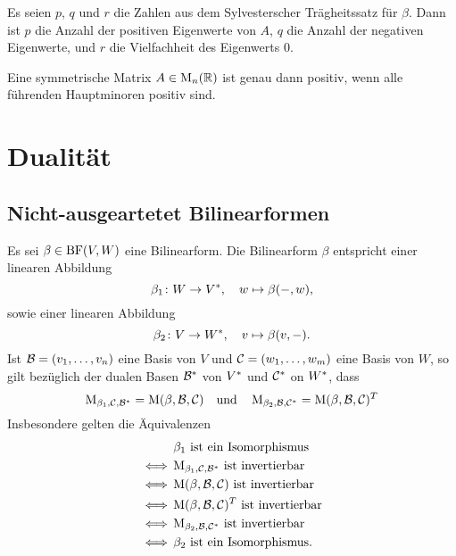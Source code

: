 \begin{proposition}
  Es seien $p$, $q$ und $r$ die Zahlen aus dem Sylvesterscher Trägheitssatz für $\beta$.
  Dann ist $p$ die Anzahl der positiven Eigenwerte von $A$, $q$ die Anzahl der negativen Eigenwerte, und $r$ die Vielfachheit des Eigenwerts $0$.
\end{proposition}

\begin{lemma}[Hauptminorenkriterium]
  Eine symmetrische Matrix $A \in \operatorname{M}_{n}(\mathbb{R})$ ist genau dann positiv, wenn alle führenden Hauptminoren positiv sind.
\end{lemma}





\section{Dualität}



\subsection{Nicht-ausgeartetet Bilinearformen}

Es sei $\beta \in \operatorname{BF}(V, W)$ eine Bilinearform.
Die Bilinearform $\beta$ entspricht einer linearen Abbildung
\[
          \beta_1
  \colon  W
  \to     V^*,
  \quad
          w
  \mapsto \beta(-,w),
\]
sowie einer linearen Abbildung
\[
          \beta_2
  \colon  V
  \to     W^*,
  \quad
          v
  \mapsto \beta(v,-).
\]
Ist $\mathcal{B} = (v_1, \dotsc, v_n)$ eine Basis von $V$ und $\mathcal{C} = (w_1, \dotsc, w_m)$ eine Basis von $W$, so gilt bezüglich der dualen Basen $\mathcal{B}^*$ von $V^*$ und $\mathcal{C}^*$ on $W^*$, dass
\[
    \operatorname{M}_{\beta_1, \mathcal{C}, \mathcal{B}^*}
  = \operatorname{M}(\beta, \mathcal{B}, \mathcal{C})
  \quad\text{und}\quad
    \operatorname{M}_{\beta_2, \mathcal{B}, \mathcal{C}^*}
  = \operatorname{M}(\beta, \mathcal{B}, \mathcal{C}) ^T
\]
Insbesondere gelten die Äquivalenzen
\begin{align*}
      &\, \text{$\beta_1$ ist ein Isomorphismus}                                                  \\
  \iff&\, \text{$\operatorname{M}_{\beta_1, \mathcal{C}, \mathcal{B}^*}$ ist invertierbar}           \\
  \iff&\, \text{$\operatorname{M}(\beta, \mathcal{B}, \mathcal{C})$ ist invertierbar}                \\
  \iff&\, \text{$\operatorname{M}(\beta, \mathcal{B}, \mathcal{C}) ^T$ ist invertierbar}  \\
  \iff&\, \text{$\operatorname{M}_{\beta_2, \mathcal{B}, \mathcal{C}^*}$ ist invertierbar}           \\
  \iff&\, \text{$\beta_2$ ist ein Isomorphismus}.
\end{align*}

